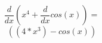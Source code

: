 \documentclass[12pt]{article}
\begin{document}
\begin{equation}
\frac{d}{dx} (x^4 + \frac{d}{dx} cos(x)) =
\end{equation}
\begin{equation}
((4 * x^3) - cos(x))
\end{equation}
\end{document}
